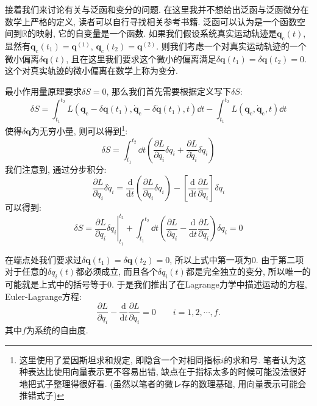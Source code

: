         接着我们来讨论有关与泛函和变分的问题. 在这里我并不想给出泛函与泛函微分在数学上严格的定义, 读者可以自行寻找相关参考书籍. 泛函可以认为是一个函数空间到$\mathbb{R}$的映射, 它的自变量是一个函数. 如果我们假设系统真实运动轨迹是$\bm q_\mathrm{c}(t)$, 显然有$\bm q_\mathrm{c}(t_1) = \bm q^{(1)}$, $\bm q_\mathrm{c}(t_2) =\bm q^{(2)}$. 则我们考虑一个对真实运动轨迹的一个微小偏离$\delta \bm q(t)$, 且在这里我们要求这个微小的偏离满足$\delta \bm q(t_1)=\delta \bm q(t_2)=0$. 这个对真实轨迹的微小偏离在数学上称为变分.

        最小作用量原理要求$\delta S = 0$, 那么我们首先需要根据定义写下$\delta S$:
        \begin{equation}
            \delta S = \int_{t_1}^{t_2} L( \bm q_\mathrm{c} - \delta \bm q(t_1) , \bm \dot q_\mathrm{c} - \delta \bm \dot q(t_1), t ) \dd t - \int_{t_1}^{t_2} L( \bm q_\mathrm{c} , \bm \dot q_\mathrm{c}, t ) \dd t
        \end{equation}
        使得$\delta \bm q$为无穷小量, 则可以得到\footnote{这里使用了爱因斯坦求和规定, 即隐含一个对相同指标$i$的求和号. 笔者认为这种表达比使用向量表示更不容易出错, 缺点在于指标太多的时候可能没法很好地把式子整理得很好看. (虽然以笔者的微レ存的数理基础, 用向量表示可能会推错式子)}:
        \begin{equation}
            \delta S = \int_{t_1}^{t_2} \dd t \left( \frac{\partial L}{\partial q_i} \delta q_i + \frac{\partial L}{\partial \dot q_i} \delta \dot q_i \right)
        \end{equation}
        我们注意到, 通过分步积分:
        \begin{equation}
            \frac{\partial L}{\partial \dot q_i} \delta \dot q_i = \frac{\mathrm{d}}{\mathrm{d} t} \left( \frac{\partial L}{\partial \dot q_i} \delta q_i \right) - \left[\frac{\mathrm{d} }{\mathrm{d} t} \frac{\partial L}{\partial \dot q_i} \right] \delta q_i
        \end{equation}
        可以得到:
        \begin{equation}\label{eq:8-1-1}
            \delta S = \left. \frac{\partial L}{\partial \dot q_i} \delta q_i \right|_{t_1}^{t_2} + \int_{t_1}^{t_2} \dd t \left( \frac{\partial L}{\partial q_i} - \frac{\mathrm{d} }{\mathrm{d} t} \frac{\partial L}{\partial \dot q_i} \right) \delta q_i = 0
        \end{equation}

        在端点处我们要求过$\delta \bm q(t_1)=\delta \bm q(t_2)=0$, 所以上式中第一项为0. 由于第二项对于任意的$\delta q_i(t)$都必须成立, 而且各个$\delta q_i(t)$都是完全独立的变分, 所以唯一的可能就是上式中的括号等于0. 于是我们推出了在Lagrange力学中描述运动的方程, Euler-Lagrange方程: 
        \begin{equation}
            \frac{\partial L}{\partial q_i} - \frac{\mathrm{d} }{\mathrm{d} t} \frac{\partial L}{\partial \dot q_i} = 0
            \qquad i = 1,2,\cdots,f.
        \end{equation}
        其中$f$为系统的自由度. 

